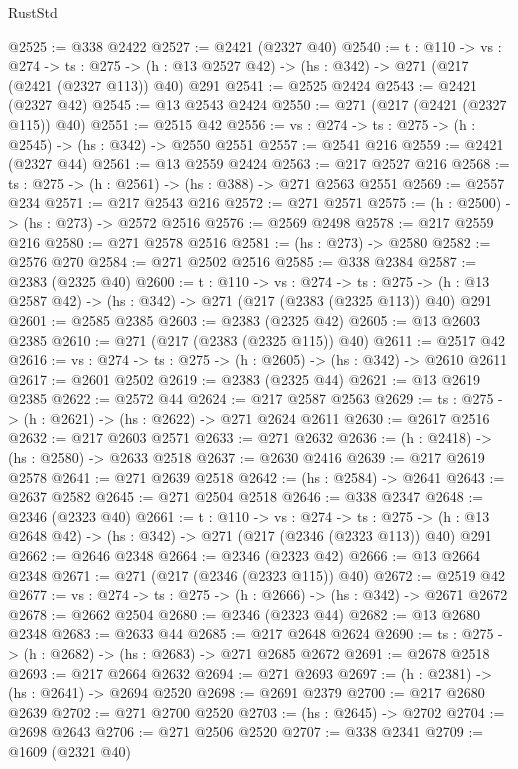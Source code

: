 \begin{lexlean}{RustStd}
\begin{coremodule}
@2525 := @338 @2422
@2527 := @2421 (@2327 @40)
@2540 := {t : @110} ->
  {vs : @274} ->
  {ts : @275} -> (h : @13 @2527 @42) -> (hs : @342) -> @271 (@217 (@2421 (@2327 @113)) @40) @291
@2541 := @2525 @2424
@2543 := @2421 (@2327 @42)
@2545 := @13 @2543 @2424
@2550 := @271 (@217 (@2421 (@2327 @115)) @40)
@2551 := @2515 @42
@2556 := {vs : @274} -> {ts : @275} -> (h : @2545) -> (hs : @342) -> @2550 @2551
@2557 := @2541 @216
@2559 := @2421 (@2327 @44)
@2561 := @13 @2559 @2424
@2563 := @217 @2527 @216
@2568 := {ts : @275} -> (h : @2561) -> (hs : @388) -> @271 @2563 @2551
@2569 := @2557 @234
@2571 := @217 @2543 @216
@2572 := @271 @2571
@2575 := (h : @2500) -> (hs : @273) -> @2572 @2516
@2576 := @2569 @2498
@2578 := @217 @2559 @216
@2580 := @271 @2578 @2516
@2581 := (hs : @273) -> @2580
@2582 := @2576 @270
@2584 := @271 @2502 @2516
@2585 := @338 @2384
@2587 := @2383 (@2325 @40)
@2600 := {t : @110} ->
  {vs : @274} ->
  {ts : @275} -> (h : @13 @2587 @42) -> (hs : @342) -> @271 (@217 (@2383 (@2325 @113)) @40) @291
@2601 := @2585 @2385
@2603 := @2383 (@2325 @42)
@2605 := @13 @2603 @2385
@2610 := @271 (@217 (@2383 (@2325 @115)) @40)
@2611 := @2517 @42
@2616 := {vs : @274} -> {ts : @275} -> (h : @2605) -> (hs : @342) -> @2610 @2611
@2617 := @2601 @2502
@2619 := @2383 (@2325 @44)
@2621 := @13 @2619 @2385
@2622 := @2572 @44
@2624 := @217 @2587 @2563
@2629 := {ts : @275} -> (h : @2621) -> (hs : @2622) -> @271 @2624 @2611
@2630 := @2617 @2516
@2632 := @217 @2603 @2571
@2633 := @271 @2632
@2636 := (h : @2418) -> (hs : @2580) -> @2633 @2518
@2637 := @2630 @2416
@2639 := @217 @2619 @2578
@2641 := @271 @2639 @2518
@2642 := (hs : @2584) -> @2641
@2643 := @2637 @2582
@2645 := @271 @2504 @2518
@2646 := @338 @2347
@2648 := @2346 (@2323 @40)
@2661 := {t : @110} ->
  {vs : @274} ->
  {ts : @275} -> (h : @13 @2648 @42) -> (hs : @342) -> @271 (@217 (@2346 (@2323 @113)) @40) @291
@2662 := @2646 @2348
@2664 := @2346 (@2323 @42)
@2666 := @13 @2664 @2348
@2671 := @271 (@217 (@2346 (@2323 @115)) @40)
@2672 := @2519 @42
@2677 := {vs : @274} -> {ts : @275} -> (h : @2666) -> (hs : @342) -> @2671 @2672
@2678 := @2662 @2504
@2680 := @2346 (@2323 @44)
@2682 := @13 @2680 @2348
@2683 := @2633 @44
@2685 := @217 @2648 @2624
@2690 := {ts : @275} -> (h : @2682) -> (hs : @2683) -> @271 @2685 @2672
@2691 := @2678 @2518
@2693 := @217 @2664 @2632
@2694 := @271 @2693
@2697 := (h : @2381) -> (hs : @2641) -> @2694 @2520
@2698 := @2691 @2379
@2700 := @217 @2680 @2639
@2702 := @271 @2700 @2520
@2703 := (hs : @2645) -> @2702
@2704 := @2698 @2643
@2706 := @271 @2506 @2520
@2707 := @338 @2341
@2709 := @1609 (@2321 @40)

\end{coremodule}
\end{lexlean}
